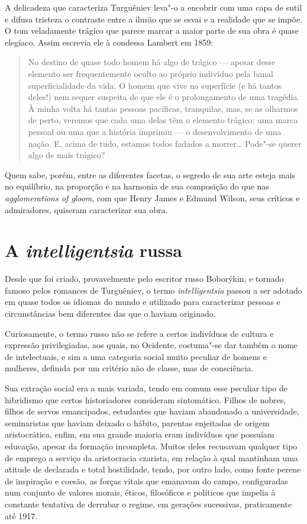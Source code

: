 A delicadeza que caracteriza Turguêniev leva"-o a encobrir com uma capa
de sutil e difusa tristeza o contraste entre a ilusão que se esvai e a
realidade que se impõe. O tom veladamente trágico que parece marcar a
maior parte de sua obra é quase elegíaco. Assim escrevia ele à condessa
Lambert em 1859:

\begin{quotation}
No destino de quase todo homem há algo de trágico --- apesar desse
elemento ser frequentemente oculto ao próprio indivíduo pela banal
superficialidade da vida. O homem que vive na superfície (e há tantos
deles!) nem sequer suspeita de que ele é o prolongamento de uma
tragédia. À minha volta há tantas pessoas pacíficas, tranquilas, mas, se as
olharmos de perto, veremos que cada uma delas têm o elemento trágico: uma
marca pessoal ou uma que a história imprimiu --- o desenvolvimento de uma
nação. E, acima de tudo, estamos todos fadados a morrer\ldots{} Pode"-se
querer algo de mais trágico?
\end{quotation}

Quem sabe, porém, entre as diferentes facetas, o segredo de sua arte esteja mais no
equilíbrio, na proporção e na harmonia de sua composição do que nas
\emph{agglomerations of gloom}, com que Henry James e Edmund Wilson, seus
críticos e admiradores, quiseram caracterizar sua obra.

\section{\uppercase{A} \emph{intelligentsia} russa}

Desde que foi criado, provavelmente pelo escritor russo Boborýkin, e tornado
famoso pelos romances de Turguêniev, o termo \emph{intelligentsia}
passou a ser adotado em quase todos os idiomas do mundo e utilizado para
caracterizar pessoas e circunstâncias bem diferentes das que o haviam
originado.

Curiosamente, o termo russo não se refere a certos indivíduos de cultura
e expressão privilegiadas, aos quais, no Ocidente, costuma"-se dar também
o nome de intelectuais, e sim a uma categoria social muito peculiar de
homens e mulheres, definida por um critério não de classe, mas de
consciência.

Sua extração social era a mais variada, tendo em comum esse peculiar
tipo de hibridismo que certos historiadores consideram sintomático.
Filhos de nobres, filhos de servos emancipados, estudantes que haviam
abandonado a universidade, seminaristas que haviam deixado o hábito,
parentas enjeitadas de origem aristocrática, enfim, em sua grande maioria eram
indivíduos que possuíam educação, apesar da formação incompleta.
Muitos deles recusavam qualquer tipo de emprego a serviço da
aristocracia czarista, em relação à qual mantinham uma atitude de
declarada e total hostilidade, tendo, por outro lado, como fonte perene
de inspiração e coesão, as forças vitais que emanavam do campo,
configuradas num conjunto de valores morais, éticos, filosóficos e
políticos que impelia à constante tentativa de derrubar o regime, em
gerações sucessivas, praticamente até 1917.

